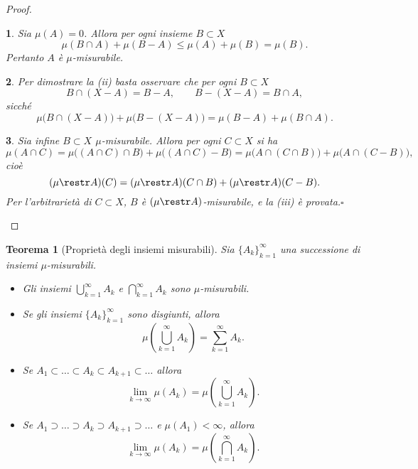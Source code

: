 \documentclass[a4paper,10pt,openright,oneside]{book}
\theoremstyle{theoremstyle}
\newtheorem{teorema}{Teorema}[section]
\theoremstyle{theoremstylewoheader}
\theoremstyle{theoremstyle}
\theoremstyle{proofsecstyle}
\newtheorem{proofsec}{}
\theoremstyle{nonumberplain}
\newtheorem{proof}{Dim.}
\renewcommand{\qedsymbol}{\ensuremath{\square}}
\newcommand{\qed}{\unskip\nobreak\hfill\nobreak\hspace{.5em}\qedsymbol}
\begin{document}
\begin{proof}
\begin{proofsec}
Sia $\mu(A) = 0$. Allora per ogni insieme $B \subset X$
\[
\mu(B \cap A) + \mu(B - A) \le \mu(A) + \mu(B) = \mu(B).
\]
Pertanto $A$ è $\mu$-misurabile.
\end{proofsec}

\begin{proofsec}
Per dimostrare la (ii) basta osservare che per ogni $B \subset X$
\[
B \cap (X - A) = B - A,\qquad B - (X - A) = B \cap A,
\]
sicché
\[
\mu\Big(B \cap (X - A)\Big) + \mu\Big(B - (X - A)\Big) = \mu(B - A) + \mu(B \cap A).
\]
\end{proofsec}

\begin{proofsec}
Sia infine $B \subset X$ $\mu$-misurabile. Allora per ogni $C \subset X$ si ha
\[
\mu(A \cap C) = \mu\Big((A \cap C) \cap B\Big) + \mu\Big((A \cap C) - B\Big) = \mu\Big(A \cap (C \cap B)\Big) + \mu\Big(A \cap (C - B)\Big),
\]
cioè
\[
(\mu \restr A)(C) = (\mu \restr A)(C \cap B) + (\mu \restr A)(C - B).
\]
Per l'arbitrarietà di $C \subset X$, $B$ è $(\mu \restr A)$-misurabile, e la (iii) è provata.\qed
\end{proofsec}
\end{proof}
\pagebreak

\begin{teorema}[Proprietà degli insiemi misurabili]
\label{thm:proprieta_insiemi_misurabili}
Sia $\{A_k\}_{k=1}^{\infty}$ una successione di insiemi $\mu$-misurabili.
\begin{itemize}
\item[(i)] Gli insiemi $\bigcup_{k=1}^{\infty} A_k$ e $\bigcap_{k=1}^{\infty} A_k$ sono $\mu$-misurabili.
\item[(ii)] Se gli insiemi $\{A_k\}_{k=1}^{\infty}$ sono disgiunti, allora
\[
\mu\left(\bigcup_{k=1}^{\infty} A_k\right) = \sum_{k=1}^{\infty} A_k.
\]
\item[(iii)] Se $A_1 \subset \ldots \subset A_k \subset A_{k+1} \subset \ldots$ allora
\[
\lim_{k \to \infty} \mu(A_k) = \mu\left(\bigcup_{k=1}^{\infty} A_k\right).
\]
\item[(iv)] Se $A_1 \supset \ldots \supset A_k \supset A_{k+1} \supset \ldots$ e $\mu(A_1) < \infty$, allora
\[
\lim_{k \to \infty} \mu(A_k) = \mu\left(\bigcap_{k=1}^{\infty} A_k\right).
\]
\end{itemize}
\end{teorema}
\end{document}
